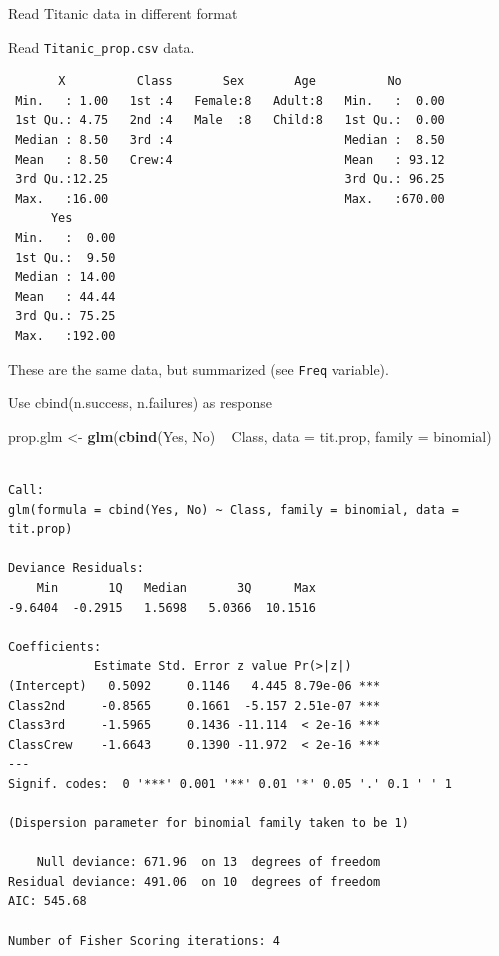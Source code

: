 \documentclass[10pt,ignorenonframetext,]{beamer}
\newenvironment{Shaded}{\begin{snugshade}}{\end{snugshade}}
\newcommand{\KeywordTok}[1]{\textcolor[rgb]{0.13,0.29,0.53}{\textbf{{#1}}}}
\newcommand{\DataTypeTok}[1]{\textcolor[rgb]{0.13,0.29,0.53}{{#1}}}
\newcommand{\StringTok}[1]{\textcolor[rgb]{0.31,0.60,0.02}{{#1}}}
\newcommand{\NormalTok}[1]{{#1}}
\begin{document}
\begin{frame}[fragile]{Read Titanic data in different format}

Read \texttt{Titanic\_prop.csv} data.

\begin{verbatim}
       X          Class       Sex       Age          No        
 Min.   : 1.00   1st :4   Female:8   Adult:8   Min.   :  0.00  
 1st Qu.: 4.75   2nd :4   Male  :8   Child:8   1st Qu.:  0.00  
 Median : 8.50   3rd :4                        Median :  8.50  
 Mean   : 8.50   Crew:4                        Mean   : 93.12  
 3rd Qu.:12.25                                 3rd Qu.: 96.25  
 Max.   :16.00                                 Max.   :670.00  
      Yes        
 Min.   :  0.00  
 1st Qu.:  9.50  
 Median : 14.00  
 Mean   : 44.44  
 3rd Qu.: 75.25  
 Max.   :192.00  
\end{verbatim}

These are the same data, but summarized (see \texttt{Freq} variable).

\end{frame}

\begin{frame}[fragile]{Use cbind(n.success, n.failures) as response}

\begin{Shaded}
\begin{Highlighting}[]
\NormalTok{prop.glm <-}\StringTok{ }\KeywordTok{glm}\NormalTok{(}\KeywordTok{cbind}\NormalTok{(Yes, No) ~}\StringTok{ }\NormalTok{Class, }\DataTypeTok{data =} \NormalTok{tit.prop, }\DataTypeTok{family =} \NormalTok{binomial)}
\end{Highlighting}
\end{Shaded}

\begin{verbatim}

Call:
glm(formula = cbind(Yes, No) ~ Class, family = binomial, data = tit.prop)

Deviance Residuals: 
    Min       1Q   Median       3Q      Max  
-9.6404  -0.2915   1.5698   5.0366  10.1516  

Coefficients:
            Estimate Std. Error z value Pr(>|z|)    
(Intercept)   0.5092     0.1146   4.445 8.79e-06 ***
Class2nd     -0.8565     0.1661  -5.157 2.51e-07 ***
Class3rd     -1.5965     0.1436 -11.114  < 2e-16 ***
ClassCrew    -1.6643     0.1390 -11.972  < 2e-16 ***
---
Signif. codes:  0 '***' 0.001 '**' 0.01 '*' 0.05 '.' 0.1 ' ' 1

(Dispersion parameter for binomial family taken to be 1)

    Null deviance: 671.96  on 13  degrees of freedom
Residual deviance: 491.06  on 10  degrees of freedom
AIC: 545.68

Number of Fisher Scoring iterations: 4
\end{verbatim}

\end{frame}
\end{document}
